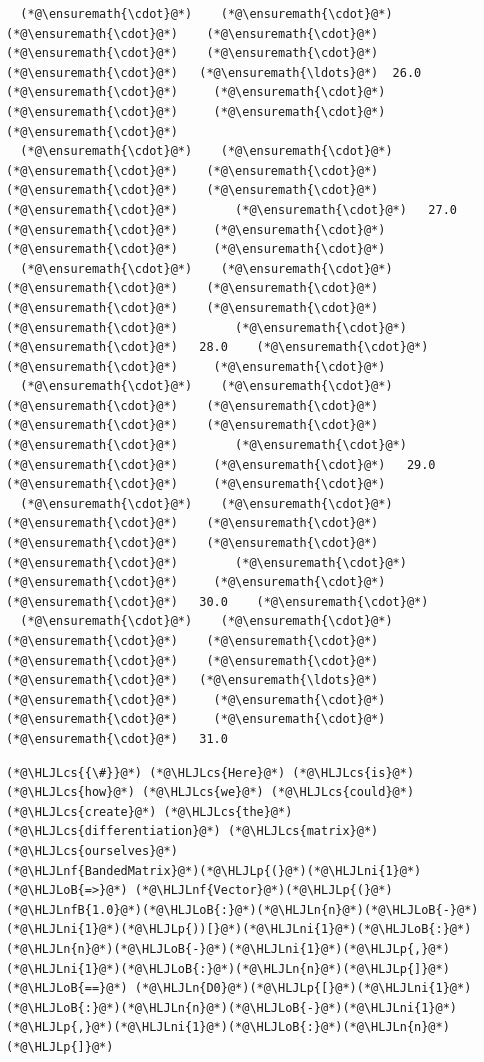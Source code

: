 \documentclass[12pt,a4paper]{article}
\newcommand{\HLJLn}[1]{#1}
\newcommand{\HLJLnf}[1]{\textcolor[RGB]{66,102,213}{#1}}
\newcommand{\HLJLnfB}[1]{\textcolor[RGB]{59,151,46}{#1}}
\newcommand{\HLJLni}[1]{\textcolor[RGB]{59,151,46}{#1}}
\newcommand{\HLJLoB}[1]{\textcolor[RGB]{102,102,102}{\textbf{#1}}}
\newcommand{\HLJLp}[1]{#1}
\newcommand{\HLJLcs}[1]{\textcolor[RGB]{153,153,119}{\textit{#1}}}
\begin{document}
\begin{lstlisting}
  (*@\ensuremath{\cdot}@*)    (*@\ensuremath{\cdot}@*)    (*@\ensuremath{\cdot}@*)    (*@\ensuremath{\cdot}@*)    (*@\ensuremath{\cdot}@*)    (*@\ensuremath{\cdot}@*)    (*@\ensuremath{\cdot}@*)   (*@\ensuremath{\ldots}@*)  26.0    (*@\ensuremath{\cdot}@*)     (*@\ensuremath{\cdot}@*)     (*@\ensuremath{\cdot}@*)     (*@\ensuremath{\cdot}@*)     (*@\ensuremath{\cdot}@*) 
  (*@\ensuremath{\cdot}@*)    (*@\ensuremath{\cdot}@*)    (*@\ensuremath{\cdot}@*)    (*@\ensuremath{\cdot}@*)    (*@\ensuremath{\cdot}@*)    (*@\ensuremath{\cdot}@*)    (*@\ensuremath{\cdot}@*)        (*@\ensuremath{\cdot}@*)   27.0    (*@\ensuremath{\cdot}@*)     (*@\ensuremath{\cdot}@*)     (*@\ensuremath{\cdot}@*)     (*@\ensuremath{\cdot}@*) 
  (*@\ensuremath{\cdot}@*)    (*@\ensuremath{\cdot}@*)    (*@\ensuremath{\cdot}@*)    (*@\ensuremath{\cdot}@*)    (*@\ensuremath{\cdot}@*)    (*@\ensuremath{\cdot}@*)    (*@\ensuremath{\cdot}@*)        (*@\ensuremath{\cdot}@*)     (*@\ensuremath{\cdot}@*)   28.0    (*@\ensuremath{\cdot}@*)     (*@\ensuremath{\cdot}@*)     (*@\ensuremath{\cdot}@*) 
  (*@\ensuremath{\cdot}@*)    (*@\ensuremath{\cdot}@*)    (*@\ensuremath{\cdot}@*)    (*@\ensuremath{\cdot}@*)    (*@\ensuremath{\cdot}@*)    (*@\ensuremath{\cdot}@*)    (*@\ensuremath{\cdot}@*)        (*@\ensuremath{\cdot}@*)     (*@\ensuremath{\cdot}@*)     (*@\ensuremath{\cdot}@*)   29.0    (*@\ensuremath{\cdot}@*)     (*@\ensuremath{\cdot}@*) 
  (*@\ensuremath{\cdot}@*)    (*@\ensuremath{\cdot}@*)    (*@\ensuremath{\cdot}@*)    (*@\ensuremath{\cdot}@*)    (*@\ensuremath{\cdot}@*)    (*@\ensuremath{\cdot}@*)    (*@\ensuremath{\cdot}@*)        (*@\ensuremath{\cdot}@*)     (*@\ensuremath{\cdot}@*)     (*@\ensuremath{\cdot}@*)     (*@\ensuremath{\cdot}@*)   30.0    (*@\ensuremath{\cdot}@*) 
  (*@\ensuremath{\cdot}@*)    (*@\ensuremath{\cdot}@*)    (*@\ensuremath{\cdot}@*)    (*@\ensuremath{\cdot}@*)    (*@\ensuremath{\cdot}@*)    (*@\ensuremath{\cdot}@*)    (*@\ensuremath{\cdot}@*)   (*@\ensuremath{\ldots}@*)    (*@\ensuremath{\cdot}@*)     (*@\ensuremath{\cdot}@*)     (*@\ensuremath{\cdot}@*)     (*@\ensuremath{\cdot}@*)     (*@\ensuremath{\cdot}@*)   31.0
\end{lstlisting}


\begin{lstlisting}
(*@\HLJLcs{{\#}}@*) (*@\HLJLcs{Here}@*) (*@\HLJLcs{is}@*) (*@\HLJLcs{how}@*) (*@\HLJLcs{we}@*) (*@\HLJLcs{could}@*) (*@\HLJLcs{create}@*) (*@\HLJLcs{the}@*) (*@\HLJLcs{differentiation}@*) (*@\HLJLcs{matrix}@*) (*@\HLJLcs{ourselves}@*)
(*@\HLJLnf{BandedMatrix}@*)(*@\HLJLp{(}@*)(*@\HLJLni{1}@*) (*@\HLJLoB{=>}@*) (*@\HLJLnf{Vector}@*)(*@\HLJLp{(}@*)(*@\HLJLnfB{1.0}@*)(*@\HLJLoB{:}@*)(*@\HLJLn{n}@*)(*@\HLJLoB{-}@*)(*@\HLJLni{1}@*)(*@\HLJLp{))[}@*)(*@\HLJLni{1}@*)(*@\HLJLoB{:}@*)(*@\HLJLn{n}@*)(*@\HLJLoB{-}@*)(*@\HLJLni{1}@*)(*@\HLJLp{,}@*)(*@\HLJLni{1}@*)(*@\HLJLoB{:}@*)(*@\HLJLn{n}@*)(*@\HLJLp{]}@*) (*@\HLJLoB{==}@*) (*@\HLJLn{D0}@*)(*@\HLJLp{[}@*)(*@\HLJLni{1}@*)(*@\HLJLoB{:}@*)(*@\HLJLn{n}@*)(*@\HLJLoB{-}@*)(*@\HLJLni{1}@*)(*@\HLJLp{,}@*)(*@\HLJLni{1}@*)(*@\HLJLoB{:}@*)(*@\HLJLn{n}@*)(*@\HLJLp{]}@*)
\end{lstlisting}
\end{document}
